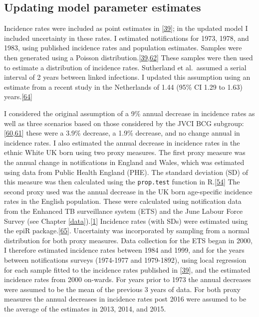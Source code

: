 \documentclass[11pt,twoside]{bristolthesis}
\begin{document}
  \hypertarget{updating-model-parameter-estimates}{%
  \subsection{Updating model parameter estimates}\label{updating-model-parameter-estimates}}
  
  Incidence rates were included as point estimates in {[}\protect\hyperlink{ref-Sutherland1989}{39}{]}; in the updated model I included uncertainty in these rates. I estimated notifications for 1973, 1978, and 1983, using published incidence rates and population estimates. Samples were then generated using a Poisson distribution.{[}\protect\hyperlink{ref-Sutherland1989}{39},\protect\hyperlink{ref-Sutherland1987a}{62}{]} These samples were then used to estimate a distribution of incidence rates. Sutherland et al.~assumed a serial interval of 2 years between linked infections. I updated this assumption using an estimate from a recent study in the Netherlands of 1.44 (95\% CI 1.29 to 1.63) years.{[}\protect\hyperlink{ref-Borgdorff2011}{64}{]}
  
  I considered the original assumption of a 9\% annual decrease in incidence rates as well as three scenarios based on those considered by the JVCI BCG subgroup:{[}\protect\hyperlink{ref-JVCIBCG2002}{60},\protect\hyperlink{ref-JVCIBCG2003}{61}{]} these were a 3.9\% decrease, a 1.9\% decrease, and no change annual in incidence rates. I also estimated the annual decrease in incidence rates in the ethnic White UK born using two proxy measures. The first proxy measure was the annual change in notifications in England and Wales, which was estimated using data from Public Health England (PHE). The standard deviation (SD) of this measure was then calculated using the \texttt{prop.test} function in R.{[}\protect\hyperlink{ref-R}{54}{]} The second proxy used was the annual decrease in the UK born age-specific incidence rates in the English population. These were calculated using notification data from the Enhanced TB surveillance system (ETS) and the June Labour Force Survey (see Chapter \ref{data}).{[}\protect\hyperlink{ref-PHE2017}{1}{]} Incidence rates (with SDs) were estimated using the epiR package.{[}\protect\hyperlink{ref-EpiR}{65}{]}. Uncertainty was incorporated by sampling from a normal distribution for both proxy measures. Data collection for the ETS began in 2000, I therefore estimated incidence rates between 1984 and 1999, and for the years between notifications surveys (1974-1977 and 1979-1892), using local regression for each sample fitted to the incidence rates published in {[}\protect\hyperlink{ref-Sutherland1989}{39}{]}, and the estimated incidence rates from 2000 on-wards. For years prior to 1973 the annual decreases were assumed to be the mean of the previous 3 years of data. For both proxy measures the annual decreases in incidence rates post 2016 were assumed to be the average of the estimates in 2013, 2014, and 2015.
  
\end{document}
